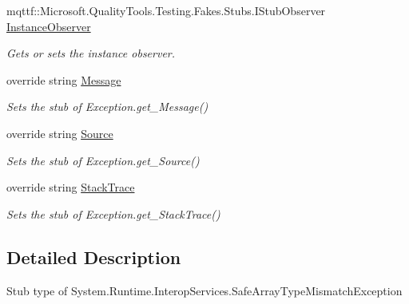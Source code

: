 \begin{DoxyCompactItemize}
mqttf\-::\-Microsoft.\-Quality\-Tools.\-Testing.\-Fakes.\-Stubs.\-I\-Stub\-Observer \hyperlink{class_system_1_1_runtime_1_1_interop_services_1_1_fakes_1_1_stub_safe_array_type_mismatch_exception_aadf5e2ccad3cfd11bc90dd3d4cc47b2e}{Instance\-Observer}
\begin{DoxyCompactList}\small\item\em Gets or sets the instance observer.\end{DoxyCompactList}\item 
override string \hyperlink{class_system_1_1_runtime_1_1_interop_services_1_1_fakes_1_1_stub_safe_array_type_mismatch_exception_afc51af625d71b228e584564b030147ff}{Message}
\begin{DoxyCompactList}\small\item\em Sets the stub of Exception.\-get\-\_\-\-Message()\end{DoxyCompactList}\item 
override string \hyperlink{class_system_1_1_runtime_1_1_interop_services_1_1_fakes_1_1_stub_safe_array_type_mismatch_exception_a5d0d9f5bf28ec4ef59492827cc979052}{Source}
\begin{DoxyCompactList}\small\item\em Sets the stub of Exception.\-get\-\_\-\-Source()\end{DoxyCompactList}\item 
override string \hyperlink{class_system_1_1_runtime_1_1_interop_services_1_1_fakes_1_1_stub_safe_array_type_mismatch_exception_a300f4941739dd4aae00866a19fbb5ca1}{Stack\-Trace}
\begin{DoxyCompactList}\small\item\em Sets the stub of Exception.\-get\-\_\-\-Stack\-Trace()\end{DoxyCompactList}\end{DoxyCompactItemize}


\subsection{Detailed Description}
Stub type of System.\-Runtime.\-Interop\-Services.\-Safe\-Array\-Type\-Mismatch\-Exception



